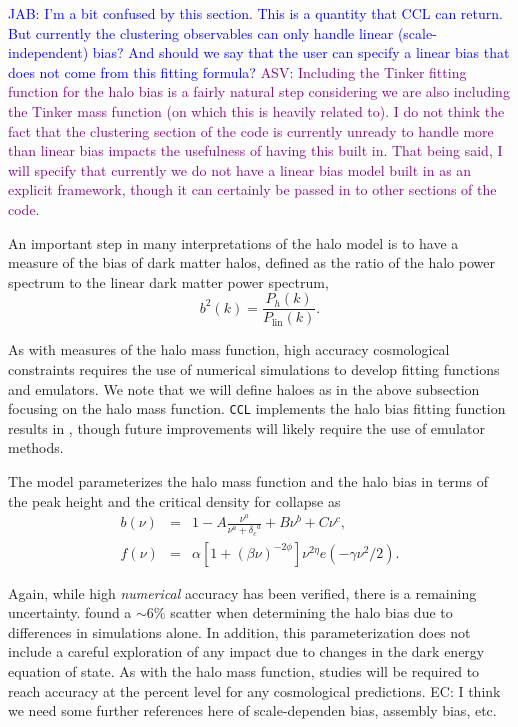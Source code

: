 \documentclass[\docopts]{\docclass}
\newcommand{\asv}[1]{\textcolor{purple}{ASV: #1}}
\newcommand{\jab}[1]{\textcolor{blue}{JAB: #1}}
\newcommand{\elisa}[1]{\textcolor{green!10!orange!90!}{EC: #1}}
\begin{document}
\jab{I'm a bit confused by this section. This is a quantity that CCL can return. But currently the clustering observables can only handle linear (scale-independent) bias? And should we say that the user can specify a linear bias that does not come from this fitting formula?}
\asv{Including the Tinker fitting function for the halo bias is a fairly natural step considering we are also including the Tinker mass function (on which this is heavily related to). I do not think the fact that the clustering section of the code is currently unready to handle more than linear bias impacts the usefulness of having this built in. That being said, I will specify that currently we do not have a linear bias model built in as an explicit framework, though it can certainly be passed in to other sections of the code.}

An important step in many interpretations of the halo model is to have a measure of the bias of dark matter halos, defined as the ratio of the halo power spectrum to the linear dark matter power spectrum,
\begin{equation}
  b^2(k) = \frac{P_h(k)}{P_{\mathrm{lin}}(k)}.
  \label{eq:halo_bias}
\end{equation}

As with measures of the halo mass function, high accuracy cosmological constraints requires the use of numerical simulations to develop fitting functions and emulators. We note that we will define haloes as in the above subsection focusing on the halo mass function. {\tt CCL} implements the halo bias fitting function results in \citet{Tinker2010}, though future improvements will likely require the use of emulator methods.

The \citet{Tinker2010} model parameterizes the halo mass function and the halo bias in terms of the peak height and the critical density for collapse as
\begin{eqnarray}
  b(\nu) &=& 1 - A\frac{\nu^a}{\nu^a + {\delta_c}^a} + B\nu^b+C\nu^c,\\
  f(\nu) &=& \alpha[1+(\beta\nu)^{-2\phi}]\nu^{2\eta}e(-\gamma\nu^2/2).
\end{eqnarray}

Again, while high {\em numerical} accuracy has been verified, there is a remaining uncertainty. \citet{Tinker2010} found a $\sim6\%$ scatter when determining the halo bias due to differences in simulations alone. In addition, this parameterization does not include a careful exploration of any impact due to changes in the dark energy equation of state. As with the halo mass function, studies will be required to reach accuracy at the percent level for any cosmological predictions. \elisa{I think we need some further references here of scale-dependen bias, assembly bias, etc.}
\end{document}
